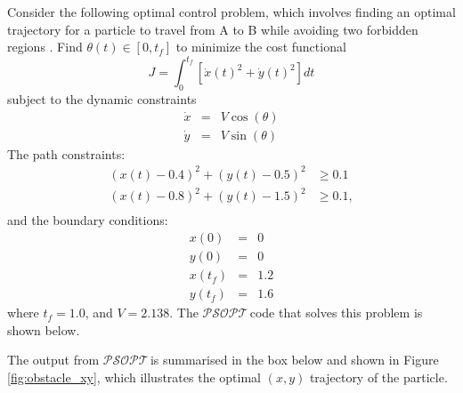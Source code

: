 \documentclass[a4paper,11pt]{report}    %
\newcommand{\psopt}{$\mathcal{PSOPT}$\,}  %
\newenvironment{shadedframe}{%
  \def\FrameCommand{\fcolorbox{black}{shadecolor}}%
  \MakeFramed {\FrameRestore}}
{\endMakeFramed}
\begin{document}
Consider the following optimal control problem, which involves finding an optimal trajectory
for a particle to travel from A to B while avoiding two forbidden regions  \cite{Rutquist:09}.  
Find  $\theta(t) \in [0, t_f]$ 
to minimize the cost functional
\begin{equation}
  J = \int_{0}^{t_f} \left[ \dot x(t)^2 + \dot y(t)^2  \right] dt
\end{equation}
subject to the dynamic constraints
\begin{equation}
  \begin{array}{lcl}
   \dot x &=& V \cos(\theta) \\
   \dot y &=& V \sin (\theta) 
  \end{array}
\end{equation}
The path constraints:
\begin{equation}
\begin{aligned}
 (x(t)-0.4)^2 + (y(t)-0.5)^2 &\ge  0.1 \\
 (x(t)-0.8)^2 + (y(t)-1.5)^2 &\ge  0.1, \\
\end{aligned}
\end{equation}
and the boundary conditions:
 \begin{equation}
  \begin{array}{lcl}
   x(0) &=& 0 \\
   y(0) &=& 0 \\
   x(t_f) &=& 1.2  \\
   y(t_f) &=& 1.6
  \end{array}
\end{equation}
where $t_f=1.0$, and $V = 2.138$. The
\psopt code that solves this problem is shown below.  

\tiny
\begin{shadedframe}

\end{shadedframe}
\normalsize

The output from \psopt is summarised in the box below and shown in Figure \ref{fig:obstacle_xy},  which illustrates
the optimal $(x,y)$ trajectory of the particle.

\begin{shadedframe}

\end{shadedframe}
\end{document}
